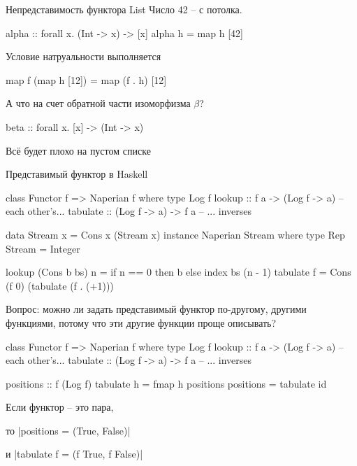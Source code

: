 \documentclass[
  russian,
  aspectratio=169,
  xcolor={svgnames},
  hyperref={colorlinks,citecolor=DeepPink4}]{beamer}
\begin{document}
\begin{frame}[fragile]{Непредставимость функтора List}
Число 42 -- с потолка.

 \begin{hslisting}
  alpha :: forall x. (Int -> x) -> [x]
  alpha h = map h [42]
 \end{hslisting}

 Условие натруальности выполняется
 \begin{hslisting}
  map f (map h [12]) = map (f . h) [12]
 \end{hslisting}
 А что на счет обратной части изоморфизма $\beta$?
 \begin{hslisting}
 beta :: forall x. [x] -> (Int -> x)
 \end{hslisting}
 Всё будет плохо на пустом списке
\end{frame}

\begin{frame}[fragile]{Представимый функтор в Haskell}
 \begin{hslisting}
  class Functor f => Naperian f where
    type Log f
    lookup   :: f a -> (Log f -> a)  -- each other's...
    tabulate :: (Log f -> a) -> f a  -- ... inverses

  data Stream x = Cons x (Stream x)
  instance Naperian Stream where
    type Rep Stream = Integer

    lookup (Cons b bs) n =
      if n == 0 then b
      else index bs (n - 1)
    tabulate f = Cons (f 0) (tabulate (f . (+1)))
 \end{hslisting}\pause

Вопрос: можно ли задать представимый функтор по-другому, другими функциями, потому что эти другие функции проще описывать?

\end{frame}

\begin{frame}[fragile]
\begin{hslisting}
  class Functor f => Naperian f where
    type Log f
    lookup   :: f a -> (Log f -> a)  -- each other's...
    tabulate :: (Log f -> a) -> f a  -- ... inverses

    positions :: f (Log f)
    tabulate h = fmap h positions
    positions = tabulate id
\end{hslisting}\vspace{0.5cm}

Если функтор -- это пара,

то \hsinline|positions = (True, False)|

и \hsinline|tabulate f = (f True, f False)|

\end{frame}
\end{document}
